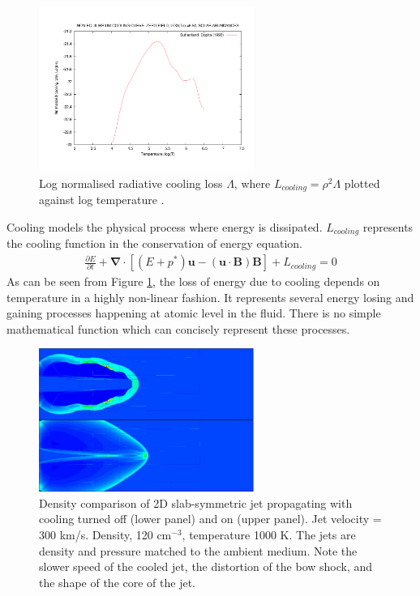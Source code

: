 \begin{figure}[t]
\centering
\includegraphics[angle=270,width=7cm]{sutherland}
\caption{
Log normalised radiative cooling loss $\Lambda$, where $L_{cooling}= \rho^2 \Lambda$ plotted against log temperature \citet{1993ApJS...88..253S}.
}
\label{fig:2-4} %
\end{figure}

Cooling models the physical process where energy is dissipated.
$L_{cooling}$ represents the cooling function in the conservation of energy equation.
\begin{eqnarray}
\frac{\partial E}{\partial t}
+\boldsymbol{\nabla}
\cdot
\left[
\left( E + p^*\right) \mathbf{u}
- (\mathbf{u}\cdot\mathbf{B})\mathbf{B}
\right] + L_{cooling} = 0
\end{eqnarray}
As can be seen from Figure \ref{fig:2-4}, the loss of energy due to cooling depends on temperature in a highly non-linear fashion.
It represents several energy losing and gaining processes happening at atomic level in the fluid.
There is no simple mathematical function which can concisely represent these processes.

\begin{figure}[t]
\centering
\includegraphics[width=7cm]{cool_compare}
\caption{
Density comparison of 2D slab-symmetric jet propagating with cooling turned off (lower panel) and on (upper panel).
Jet velocity = 300 km/s. Density, 120 cm$^{-3}$, temperature 1000 K.
The jets are density and pressure matched to the ambient medium. 
Note the slower speed of the cooled jet, the distortion of the bow shock, and the shape of the core of the jet.
}
\label{fig:2-5} %
\end{figure}

